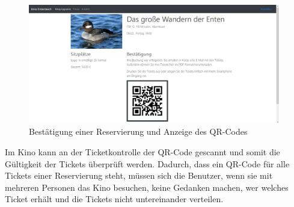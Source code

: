 \begin{figure}[ht]
	\centering
	\includegraphics[width=0.98\textwidth]{img/screenshots/vorstellung04}
	\captionsetup{format=hang}
	\caption{Bestätigung einer Reservierung und Anzeige des \acs{QR-Code}s}
	\label{fig:vorstellung04}
\end{figure}

Im Kino kann an der Ticketkontrolle der \acs{QR-Code} gescannt und somit die Gültigkeit der Tickets überprüft werden.
Dadurch, dass ein \acs{QR-Code} für alle Tickets einer Reservierung steht, müssen sich die Benutzer, wenn sie mit mehreren Personen das Kino besuchen, keine Gedanken machen, wer welches Ticket erhält und die Tickets nicht untereinander verteilen. %
